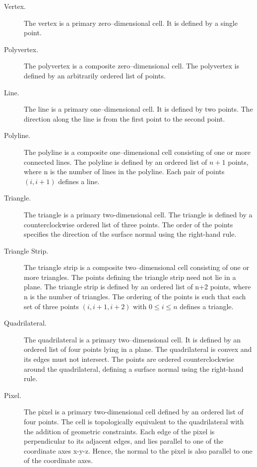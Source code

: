 \begin{description}

\item[Vertex.] The vertex is a primary zero--dimensional cell. It is defined by a single point.

\item[Polyvertex.] The polyvertex is a composite zero--dimensional cell. The polyvertex is defined by an arbitrarily ordered list of points.

\item[Line.] The line is a primary one--dimensional cell. It is defined by two points. The direction along the line is from the first point to the second point.

\item[Polyline.] The polyline is a composite one--dimensional cell consisting of one or more connected lines. The polyline is defined by an ordered list of $n+1$ points, where n is the number of lines in the polyline. Each pair of points $(i, i+1)$ defines a line.

\item[Triangle.] \label{subsec:linear_cells.triangle_strip} The triangle is a primary two-dimensional cell. The triangle is defined by a counterclockwise ordered list of three points. The order of the points specifies the direction of the surface normal using the right-hand rule.

\item[Triangle Strip.] The triangle strip is a composite two--dimensional cell consisting of one or more triangles. The points defining the triangle strip need not lie in a plane. The triangle strip is defined by an ordered list of n+2 points, where n is the number of triangles. The ordering of the points is such that each set of three points $(i,i+1,i+2)$ with $0 \leq i \leq n$ defines a triangle.

\item[Quadrilateral.] The quadrilateral is a primary two--dimensional cell. It is defined by an ordered list of four points lying in a plane. The quadrilateral is convex and its edges must not intersect. The points are ordered counterclockwise around the quadrilateral, defining a surface normal using the right-hand rule.

\item[Pixel.] The pixel is a primary two-dimensional cell defined by an ordered list of four points. The cell is topologically equivalent to the quadrilateral with the addition of geometric constraints. Each edge of the pixel is perpendicular to its adjacent edges, and lies parallel to one of the coordinate axes x-y-z. Hence, the normal to the pixel is also parallel to one of the coordinate axes.


\end{description}
